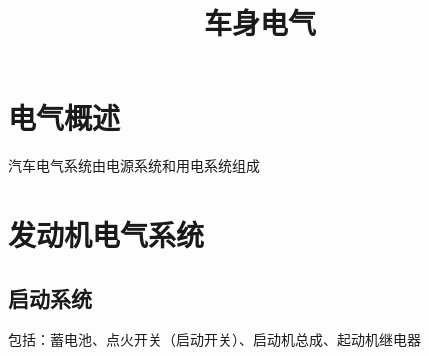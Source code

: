 
\graphicspath{{../img/}}
\title{车身电气}
\author{}
\date{}

\setlength{\parskip}{0em}	%
\setlength{\parindent}{2em} %
\setlength{\baselineskip}{20pt}	%
\selectfont	%
\setlength{\lineskip}{10pt}		%
\setlength{\lineskiplimit}{10pt}	%
\abovedisplayshortskip=0pt	%
\belowdisplayshortskip=0pt
\abovedisplayskip=0pt	%
\belowdisplayskip=0pt
\renewcommand{\arraystretch}{1.5}

\maketitle
\section{电气概述}
汽车电气系统由电源系统和用电系统组成

\section{发动机电气系统}
\subsection{启动系统}
	包括：蓄电池、点火开关（启动开关）、启动机总成、起动机继电器
	\begin{figure}[htbp]
		\centering
	\end{figure}
	

